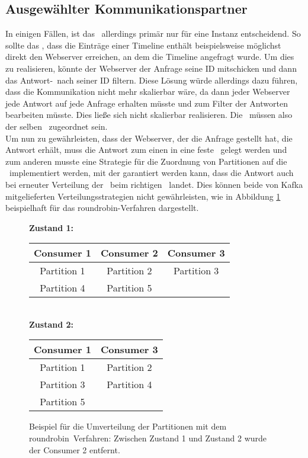 \subsection{Ausgewählter Kommunikationspartner}
In einigen Fällen, ist das \Ev\ allerdings primär nur für eine Instanz entscheidend. So sollte das \Ev, dass die Einträge einer Timeline enthält beispielsweise möglichst direkt den Webserver erreichen, an dem die Timeline angefragt wurde. Um dies zu realisieren, könnte der Webserver der Anfrage seine ID mitschicken und dann das Antwort-\T\ nach seiner ID filtern. Diese Lösung würde allerdings dazu führen, dass die Kommunikation nicht mehr skalierbar wäre, da dann jeder Webserver jede Antwort auf jede Anfrage erhalten müsste und zum Filter der Antworten bearbeiten müsste. Dies ließe sich nicht skalierbar realisieren. Die \C\ müssen also der selben \CG\ zugeordnet sein. \\
Um nun zu gewährleisten, dass der Webserver, der die Anfrage gestellt hat, die Antwort erhält, muss die Antwort zum einen in eine feste \Pt\ gelegt werden und zum anderen musste eine Strategie für die Zuordnung von Partitionen auf die \C\ implementiert werden, mit der garantiert werden kann, dass die Antwort auch bei erneuter Verteilung der \Pts\ beim richtigen \C\ landet. Dies können beide von Kafka mitgelieferten Verteilungsstrategien nicht gewährleisten, wie in Abbildung \ref{fig:roundrobin} beispielhaft für das \glqq roundrobin\grqq-Verfahren dargestellt.
\begin{figure}
	\caption{Beispiel für die Umverteilung der Partitionen mit dem \glqq roundrobin\grqq\ Verfahren: Zwischen Zustand 1 und Zustand 2 wurde der Consumer 2 entfernt.}
	\label{fig:roundrobin}	
	\centering
	\textbf{Zustand 1:} \\
	\begin{tabular}{c | c | c}
		Consumer 1 & Consumer 2 & Consumer 3 \\
		\hline
		Partition 1 & Partition 2 & Partition 3 \\
		Partition 4 & Partition 5
	\end{tabular} \\[0.5cm]
	\textbf{Zustand 2:} \\
	\begin{tabular}{c | c}
	Consumer 1 & Consumer 3 \\
	\hline
	Partition 1 & Partition 2 \\
	Partition 3 & Partition 4 \\
	Partition 5
	\end{tabular}
\end{figure} \\
